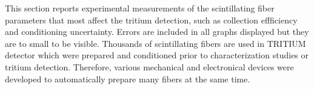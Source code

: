 This section reports experimental measurements of the scintillating fiber parameters that most affect the tritium detection, such as collection effficiency and conditioning uncertainty. Errors are included in all graphs displayed but they are to small to be visible. Thousands of scintillating fibers are used in TRITIUM detector which were prepared and conditioned prior to characterization studies or tritium detection. Therefore, various mechanical and electronical devices were developed to automatically prepare many fibers at the same time.